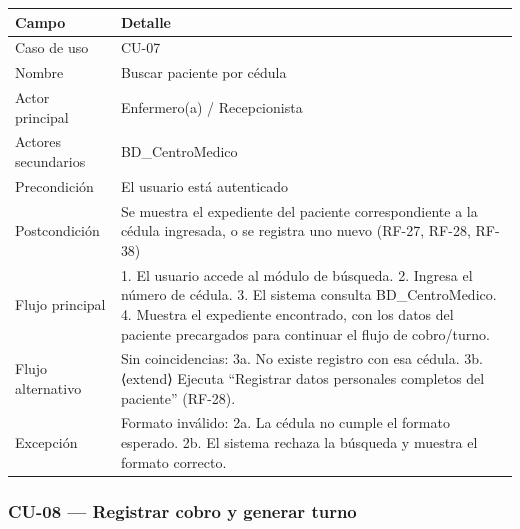 \documentclass[11pt,a4paper]{article}
\begin{document}
	\begin{longtable}{p{} p{} }
		
		
		\toprule
		\textbf{Campo} &
		\textbf{Detalle}  \\
		\midrule
		\endhead
		
		Caso de uso & CU-07 \\
		Nombre & Buscar paciente por cédula \\
		Actor principal & Enfermero(a) / Recepcionista \\
		Actores secundarios & BD\_CentroMedico \\
		Precondición & El usuario está autenticado \\
		Postcondición & Se muestra el expediente del paciente correspondiente a la cédula ingresada, o se registra uno nuevo (RF-27, RF-28, RF-38) \\
		Flujo principal & 1. El usuario accede al módulo de búsqueda. 2. Ingresa el número de cédula. 3. El sistema consulta BD\_CentroMedico. 4. Muestra el expediente encontrado, con los datos del paciente precargados para continuar el flujo de cobro/turno. \\
		Flujo alternativo & Sin coincidencias: 3a. No existe registro con esa cédula. 3b. ⟨extend⟩ Ejecuta ``Registrar datos personales completos del paciente'' (RF-28). \\
		Excepción & Formato inválido: 2a. La cédula no cumple el formato esperado. 2b. El sistema rechaza la búsqueda y muestra el formato correcto. \\
		\bottomrule
	\end{longtable}
	
	\subsubsection{CU-08 --- Registrar cobro y generar turno}
	
\end{document}
